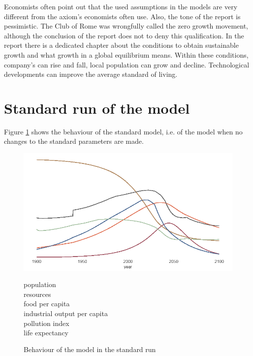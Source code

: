 \documentclass[10pt,a4paper]{scrartcl}
\begin{document}
Economists often point out that the used assumptions in the models are very different from the axiom's economists often use. Also, the tone of the report is pessimistic. The Club of Rome was wrongfully called the zero growth movement, although the conclusion of the report does not to deny this qualification. In the report there is a dedicated chapter about the conditions to obtain sustainable growth and what growth in a global equilibrium means. Within these conditions, company's can rise and fall, local population can grow and decline. Technological developments can improve the average standard of living.

\section*{Standard run of the model}

Figure \ref{standard-run} shows the behaviour of the standard model, i.e. of the model when no changes to the standard parameters are made.

\begin{figure}
\centering
\begin{minipage}{0.79\textwidth}
\includegraphics[width=\textwidth]{./plaatjes/standard-run.png}
\end{minipage}
\begin{minipage}{0.2\textwidth}
\textcolor[HTML]{e07154}{population}\\
\textcolor[HTML]{b0875e}{resources}\\
\textcolor[HTML]{a8c3a5}{food per capita}\\
\textcolor[HTML]{4a6892}{industrial output per capita}\\
\textcolor[HTML]{a25563}{pollution index}\\
\textcolor[HTML]{666666}{life expectancy}\\
\end{minipage}
\caption{Behaviour of the model in the standard run}
\label{standard-run}
\end{figure}
\end{document}
